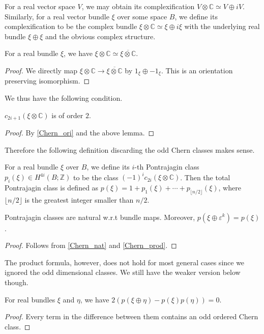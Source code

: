 	\begin{defn}
		For a real vector space $V$, we may obtain its complexification $V\otimes\mathbb{C}\simeq V\oplus iV$. Similarly, for a real vector bundle $\xi$ over some space $B$, we define its complexification to be the complex bundle $\xi\otimes\mathbb{C}\simeq\xi\oplus i\xi$ with the underlying real bundle $\xi\oplus\xi$ and the obvious complex structure. 
	\end{defn}

	\begin{lemma}
		For a real bundle $\xi$, we have $\xi\otimes\mathbb{C}\simeq\overline{\xi\otimes\mathbb{C}}$. 
	\end{lemma}
	\begin{proof}
		We directly map $\xi\otimes\mathbb{C}\to\overline{\xi\otimes\mathbb{C}}$ by $1_\xi\oplus-1_\xi$. This is an orientation preserving isomorphism. 
	\end{proof}
	
	We thus have the following condition. 
	\begin{coro}
		$c_{2i+1}(\xi\otimes\mathbb{C})$ is of order $2$. 
	\end{coro}
	\begin{proof}
		By \cref{Chern_ori} and the above lemma. 
	\end{proof}
	Therefore the following definition discarding the odd Chern classes makes sense. 
	\begin{defn}\label{Pontr_class}
		For a real bundle $\xi$ over $B$, we define its $i$-th Pontrajagin class $p_i(\xi)\in H^{4i}(B;\mathbb{Z})$ to be the class $(-1)^ic_{2i}(\xi\otimes\mathbb{C})$. Then the total Pontrajagin class is defined as $p(\xi)=1+p_1(\xi)+\cdots+p_{\lfloor n/2\rfloor}(\xi)$, where $\lfloor n/2\rfloor$ is the greatest integer smaller than $n/2$. 
	\end{defn}

	\begin{coro}\label{Pontr_nat_triv}
		Pontrajagin classes are natural w.r.t bundle maps. Moreover, $p(\xi\oplus\varepsilon^k)=p(\xi)$. 
	\end{coro}
	\begin{proof}
		Follows from \cref{Chern_nat} and \cref{Chern_prod}. 
	\end{proof}

	The product formula, however, does not hold for most general cases since we ignored the odd dimensional classes. We still have the weaker version below though. 
	\begin{coro}
		For real bundles $\xi$ and $\eta$, we have $2(p(\xi\oplus\eta)-p(\xi)p(\eta))=0$. 
	\end{coro}
	\begin{proof}
		Every term in the difference between them contains an odd ordered Chern class. 
	\end{proof}

